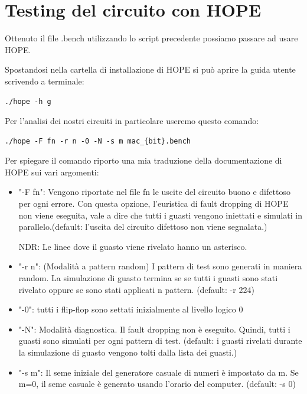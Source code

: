 \documentclass[12pt, letterpaper]{article}
\begin{document}
\section{Testing del circuito con HOPE}

Ottenuto il file .bench utilizzando lo script precedente possiamo passare ad usare HOPE.

Spostandosi nella cartella di installazione di HOPE si può aprire la guida utente scrivendo a terminale:
\begin{lstlisting}
./hope -h g
\end{lstlisting}

Per l'analisi dei nostri circuiti in particolare useremo questo comando: 

\begin{lstlisting}
./hope -F fn -r n -0 -N -s m mac_{bit}.bench
\end{lstlisting}

Per spiegare il comando riporto una mia traduzione della documentazione di HOPE sui vari argomenti:

\begin{itemize}
\item "-F fn": Vengono riportate nel file fn le uscite del circuito buono e difettoso per ogni errore. Con questa opzione, l'euristica di fault dropping di HOPE non viene eseguita, vale a dire che tutti i guasti vengono iniettati e simulati in parallelo.(default: l'uscita del circuito difettoso non viene segnalata.) 

NDR: Le linee dove il guasto viene rivelato hanno un asterisco.

\item "-r n": (Modalità a pattern random)
I pattern di test sono generati in maniera random. La simulazione di guasto termina se se tutti i guasti sono stati rivelato oppure se sono stati applicati n pattern. (default: -r 224)

\item "-0": tutti i flip-flop sono settati inizialmente al livello logico 0

\item "-N": Modalità diagnostica. Il fault dropping non è eseguito. Quindi, tutti i guasti sono simulati per ogni pattern di test. (default: i guasti rivelati durante la simulazione di guasto vengono tolti dalla lista dei guasti.)

\item "-s m": Il seme iniziale del generatore casuale di numeri è impostato da m.
Se m=0, il seme casuale è generato usando l'orario del computer. (default: -s 0)

\end{itemize}
\end{document}
